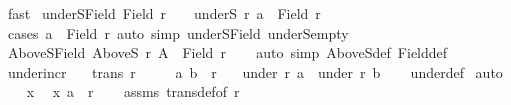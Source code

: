 \begin{isabellebody}
\ fast%
\endisatagproof
{\isafoldproof}%
%
\isadelimproof
\isanewline
%
\endisadelimproof
\isanewline
{}\isamarkupfalse%
\ underS{\isacharunderscore}{\kern0pt}Field{}{\isacharcolon}{\kern0pt}\ {\isachardoublequoteopen}Field\ r\ {\isasymnoteq}\ {\isacharbraceleft}{\kern0pt}{\isacharbraceright}{\kern0pt}\ {\isasymLongrightarrow}\ underS\ r\ a\ {\isasymsubset}\ Field\ r{\isachardoublequoteclose}\isanewline
%
\isadelimproof
\ \ %
\endisadelimproof
%
\isatagproof
{}\isamarkupfalse%
\ {\isacharparenleft}{\kern0pt}cases\ {\isachardoublequoteopen}a\ {\isasymin}\ Field\ r{\isachardoublequoteclose}{\isacharparenright}{\kern0pt}\ {\isacharparenleft}{\kern0pt}auto\ simp{\isacharcolon}{\kern0pt}\ underS{\isacharunderscore}{\kern0pt}Field{}\ underS{\isacharunderscore}{\kern0pt}empty{\isacharparenright}{\kern0pt}%
\endisatagproof
{\isafoldproof}%
%
\isadelimproof
\isanewline
%
\endisadelimproof
\isanewline
{}\isamarkupfalse%
\ AboveS{\isacharunderscore}{\kern0pt}Field{\isacharcolon}{\kern0pt}\ {\isachardoublequoteopen}AboveS\ r\ A\ {\isasymsubseteq}\ Field\ r{\isachardoublequoteclose}\isanewline
%
\isadelimproof
\ \ %
\endisadelimproof
%
\isatagproof
{}\isamarkupfalse%
\ {\isacharparenleft}{\kern0pt}auto\ simp{\isacharcolon}{\kern0pt}\ AboveS{\isacharunderscore}{\kern0pt}def\ Field{\isacharunderscore}{\kern0pt}def{\isacharparenright}{\kern0pt}%
\endisatagproof
{\isafoldproof}%
%
\isadelimproof
\isanewline
%
\endisadelimproof
\isanewline
{}\isamarkupfalse%
\ under{\isacharunderscore}{\kern0pt}incr{\isacharcolon}{\kern0pt}\isanewline
\ \ \ {\isachardoublequoteopen}trans\ r{\isachardoublequoteclose}\isanewline
\ \ \ \ \ {\isachardoublequoteopen}{\isacharparenleft}{\kern0pt}a{\isacharcomma}{\kern0pt}\ b{\isacharparenright}{\kern0pt}\ {\isasymin}\ r{\isachardoublequoteclose}\isanewline
\ \ \ {\isachardoublequoteopen}under\ r\ a\ {\isasymsubseteq}\ under\ r\ b{\isachardoublequoteclose}\isanewline
%
\isadelimproof
\ \ %
\endisadelimproof
%
\isatagproof
{}\isamarkupfalse%
\ under{\isacharunderscore}{\kern0pt}def\isanewline
{}\isamarkupfalse%
\ auto\isanewline
\ \ \isamarkupfalse%
\ x\ \isamarkupfalse%
\ {\isachardoublequoteopen}{\isacharparenleft}{\kern0pt}x{\isacharcomma}{\kern0pt}\ a{\isacharparenright}{\kern0pt}\ {\isasymin}\ r{\isachardoublequoteclose}\isanewline
\ \ \isamarkupfalse%
\ assms\ trans{\isacharunderscore}{\kern0pt}def{\isacharbrackleft}{\kern0pt}of\ r{\isacharbrackright}{\kern0pt}\ \isamarkupfalse%

\end{isabellebody}
